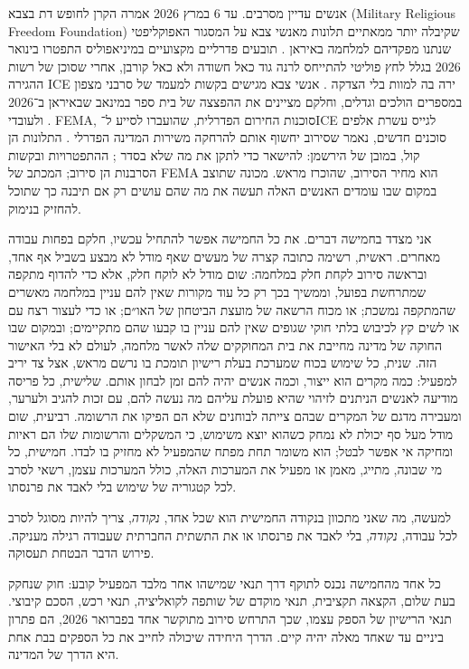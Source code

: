 אנשים עדיין מסרבים. עד 6 במרץ 2026 אמרה הקרן לחופש דת בצבא (Military Religious Freedom Foundation) שקיבלה יותר ממאתיים תלונות מאנשי צבא על המסגור האפוקליפטי שנתנו מפקדיהם למלחמה באיראן \autocite{Snopes2026MRFF}. תובעים פדרליים מקצועיים במיניאפוליס התפטרו בינואר 2026 בגלל לחץ פוליטי להתייחס לרנה גוד כאל חשודה ולא כאל קורבן, אחרי שסוכן של רשות ההגירה ICE ירה בה למוות בלי הצדקה \autocite{Kaplan2026MinnProsecutors,CBS2026MinnFraudProsecutors,Wikipedia2026ReneeGood}. אנשי צבא מגישים בקשות למעמד של סרבני מצפון במספרים הולכים וגדלים, וחלקם מציינים את ההפצצה של בית ספר במינאב שבאיראן ב־2026 \autocite{Sridhar2026CO}. ולעובדי FEMA, סוכנות החירום הפדרלית, שהועברו לסייע ל־ICE לגייס עשרת אלפים סוכנים חדשים, נאמר שסירוב יחשוף אותם להרחקה משירות המדינה הפדרלי \autocite{Dayen2025FEMAICE,Stanton2026FEMALetter}. התלונות הן קול, במובן של הירשמן: להישאר כדי לתקן את מה שלא בסדר \autocite{hirschman1970exit}; ההתפטרויות ובקשות הסרבנות הן סירוב; המכתב של FEMA הוא מחיר הסירוב, שהוכרז מראש. מכונה שתוצב במקום שבו עומדים האנשים האלה תעשה את מה שהם עושים רק אם תיבנה כך שתוכל להחזיק בנימוק.

אני מצדד בחמישה דברים. את כל החמישה אפשר להתחיל עכשיו, חלקם בפחות עבודה מאחרים. ראשית, רשימה כתובה קצרה של מעשים שאף מודל לא מבצע בשביל אף אחד, ובראשה סירוב לקחת חלק במלחמה: שום מודל לא לוקח חלק, אלא כדי להדוף מתקפה שמתרחשת בפועל, וממשיך בכך רק כל עוד מקורות שאין להם עניין במלחמה מאשרים שהמתקפה נמשכת; או מכוח הרשאה של מועצת הביטחון של האו״ם; או כדי לעצור רצח עם או לשים קץ לכיבוש בלתי חוקי שגופים שאין להם עניין בו קבעו שהם מתקיימים; ובמקום שבו החוקה של מדינה מחייבת את בית המחוקקים שלה לאשר מלחמה, לעולם לא בלי האישור הזה. שנית, כל שימוש בכוח שמערכת בעלת רישיון תומכת בו נרשם מראש, אצל צד יריב למפעיל: כמה מקרים הוא ייצור, וכמה אנשים יהיה להם זמן לבחון אותם. שלישית, כל פריסה מודיעה לאנשים הניתנים לזיהוי שהיא פועלת עליהם מה נעשה להם, עם זכות להגיב ולערער, ומעבירה מדגם של המקרים שבהם צייתה לבוחנים שלא הם הפיקו את הרשומה. רביעית, שום מודל מעל סף יכולת לא נמחק כשהוא יוצא משימוש, כי המשקלים והרשומות שלו הם ראיות ומחיקה אי אפשר לבטל; הוא משומר תחת מפתח שהמפעיל לא מחזיק בו לבדו. חמישית, כל מי שבונה, מתייג, מאמן או מפעיל את המערכות האלה, כולל המערכות עצמן, רשאי לסרב לכל קטגוריה של שימוש בלי לאבד את פרנסתו.

למעשה, מה שאני מתכוון בנקודה החמישית הוא שכל אחד, \emph{נקודה}, צריך להיות מסוגל לסרב לכל עבודה, \emph{נקודה}, בלי לאבד את פרנסתו או את התשתית החברתית שעבודה רגילה מעניקה. פירוש הדבר הבטחת תעסוקה.

כל אחד מהחמישה נכנס לתוקף דרך תנאי שמישהו אחר מלבד המפעיל קובע: חוק שנחקק בעת שלום, הקצאה תקציבית, תנאי מוקדם של שותפה לקואליציה, תנאי רכש, הסכם קיבוצי. תנאי הרישיון של הספק עצמו, שכך התרחש סירוב מתוקשר אחד בפברואר 2026, הם פתרון ביניים עד שאחד מאלה יהיה קיים. הדרך היחידה שיכולה לחייב את כל הספקים בבת אחת היא הדרך של המדינה.

